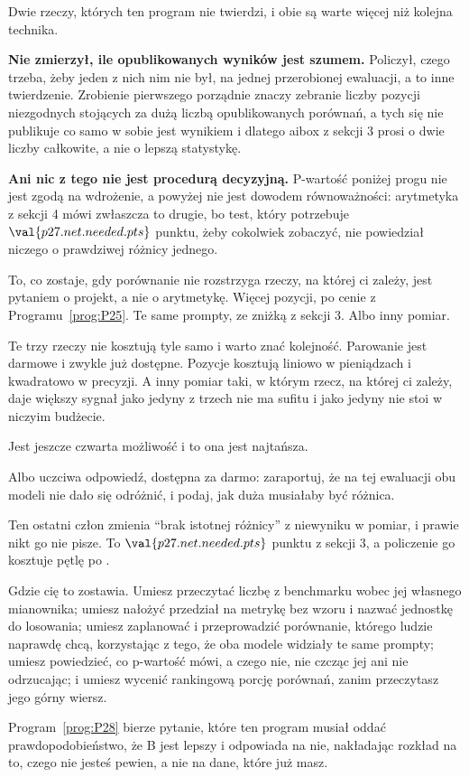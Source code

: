 \begin{fr}
Dwie rzeczy, których ten program nie twierdzi, i obie są warte więcej niż
kolejna technika.

\textbf{Nie zmierzył, ile opublikowanych wyników jest szumem.} Policzył, czego
trzeba, żeby jeden z nich nim nie był, na jednej przerobionej ewaluacji, a to
inne twierdzenie. Zrobienie pierwszego porządnie znaczy zebranie liczby
pozycji niezgodnych stojących za dużą liczbą opublikowanych porównań, a tych
się nie publikuje \dash{} co samo w sobie jest wynikiem i dlatego aibox z
sekcji 3 prosi o dwie liczby całkowite, a nie o lepszą statystykę.

\textbf{Ani nic z tego nie jest procedurą decyzyjną.} P-wartość poniżej progu
nie jest zgodą na wdrożenie, a powyżej nie jest dowodem równoważności:
arytmetyka z sekcji 4 mówi zwłaszcza to drugie, bo test, który potrzebuje
$\val{p27.net.needed.pts}$ punktu, żeby cokolwiek zobaczyć, nie powiedział
niczego o prawdziwej różnicy jednego.

To, co zostaje, gdy porównanie nie rozstrzyga rzeczy, na której ci zależy, jest
pytaniem o projekt, a nie o arytmetykę. Więcej pozycji, po cenie z
Programu~\ref{prog:P25}. Te same prompty, ze zniżką z sekcji 3. Albo inny
pomiar.

Te trzy rzeczy nie kosztują tyle samo i warto znać kolejność. Parowanie jest
darmowe i zwykle już dostępne. Pozycje kosztują liniowo w pieniądzach i
kwadratowo w precyzji. A inny pomiar \dash{} taki, w którym rzecz, na której
ci zależy, daje większy sygnał \dash{} jako jedyny z trzech nie ma sufitu i
jako jedyny nie stoi w niczyim budżecie.

Jest jeszcze czwarta możliwość i to ona jest najtańsza.
\dotline
\nextframe
\end{fr}

\begin{fr}
\begin{ansblock}
Albo uczciwa odpowiedź, dostępna za darmo: zaraportuj, że na tej ewaluacji obu
modeli nie dało się odróżnić, i podaj, jak duża musiałaby być różnica.
\end{ansblock}

Ten ostatni człon zmienia \enquote{brak istotnej różnicy} z niewyniku w pomiar,
i prawie nikt go nie pisze. To $\val{p27.net.needed.pts}$ punktu z sekcji 3, a
policzenie go kosztuje pętlę po .

Gdzie cię to zostawia. Umiesz przeczytać liczbę z benchmarku wobec jej własnego
mianownika; umiesz nałożyć przedział na metrykę bez wzoru i nazwać jednostkę do
losowania; umiesz zaplanować i przeprowadzić porównanie, którego ludzie
naprawdę chcą, korzystając z tego, że oba modele widziały te same prompty;
umiesz powiedzieć, co p-wartość mówi, a czego nie, nie czcząc jej ani nie
odrzucając; i umiesz wycenić rankingową porcję porównań, zanim przeczytasz jego
górny wiersz.

Program~\ref{prog:P28} bierze pytanie, które ten program musiał oddać \dash{}
prawdopodobieństwo, że B jest lepszy \dash{} i odpowiada na nie, nakładając
rozkład na to, czego nie jesteś pewien, a nie na dane, które już masz.
\end{fr}

